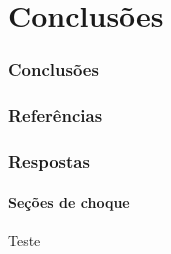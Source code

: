 \documentclass[svgnames,smaller,table]{beamer}
\begin{document}
\section{Conclusões}
\begin{frame}
  \frametitle{Conclusões}
  \framesubtitle{}
\end{frame}

\begin{frame}[allowframebreaks]
        \frametitle{Referências}
        
        
\end{frame}


\begin{frame}[noframenumbering]
  \frametitle{Respostas}
  \framesubtitle{Seções de choque}
  Teste
\end{frame}
\end{document}
